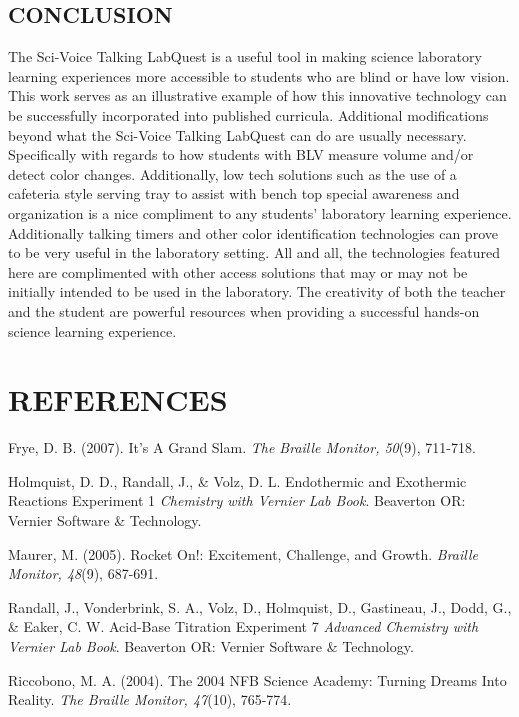 \documentclass[11.5pt]{sig-alternate} %
\begin{document}
\begin{large}
\section*{CONCLUSION}

The Sci-Voice Talking LabQuest is a useful tool in making science laboratory learning experiences more accessible to students who are blind or have low vision. This work serves as an illustrative example of how this innovative technology can be successfully incorporated into published curricula. Additional modifications beyond what the Sci-Voice Talking LabQuest can do are usually necessary. Specifically with regards to how students with BLV measure volume and/or detect color changes. Additionally, low tech solutions such as the use of a cafeteria style serving tray to assist with bench top special awareness and organization is a nice compliment to any students’ laboratory learning experience. Additionally talking timers and other color identification technologies can prove to be very useful in the laboratory setting. All and all, the technologies featured here are complimented with other access solutions that may or may not be initially intended to be used in the laboratory. The creativity of both the teacher and the student are powerful resources when providing a successful hands-on science learning experience.

\end{large}
\clearpage
\section*{REFERENCES}\par 

\leftskip 0.25in
\parindent -0.25in 
Frye, D. B. (2007). It's A Grand Slam. \textit{The Braille Monitor, 50}(9), 711-718. 

Holmquist, D. D., Randall, J., \& Volz, D. L. Endothermic and Exothermic Reactions Experiment 1 \textit{Chemistry with Vernier Lab Book}. Beaverton OR: Vernier Software \& Technology.

Maurer, M. (2005). Rocket On!: Excitement, Challenge, and Growth. \textit{Braille Monitor, 48}(9), 687-691. 

Randall, J., Vonderbrink, S. A., Volz, D., Holmquist, D., Gastineau, J., Dodd, G., \& Eaker, C. W. Acid-Base Titration Experiment 7 \textit{Advanced Chemistry with Vernier Lab Book}. Beaverton OR: Vernier Software \& Technology.

Riccobono, M. A. (2004). The 2004 NFB Science Academy: Turning Dreams Into Reality. \textit{The Braille Monitor, 47}(10), 765-774. 
\end{document}

